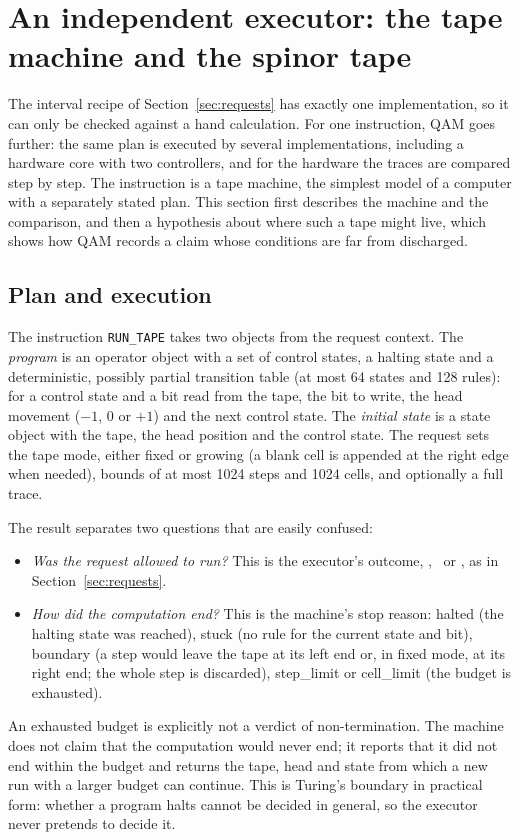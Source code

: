 \section{An independent executor: the tape machine and the spinor tape}\label{sec:tape}

The interval recipe of Section~\ref{sec:requests} has exactly one implementation, so it can only be checked against a hand calculation.
For one instruction, QAM goes further: the same plan is executed by several implementations, including a hardware core with two controllers, and for the hardware the traces are compared step by step. The instruction is a tape machine, the simplest model of a computer with a
separately stated plan. This section first describes the machine and the comparison, and then a hypothesis about where such a tape
might live, which shows how QAM records a claim whose conditions are far from discharged.

\subsection{Plan and execution}

The instruction \texttt{RUN\_TAPE} takes two objects from the request context. The \emph{program} is an operator object with a set of
control states, a halting state and a deterministic, possibly partial transition table (at most 64 states and 128 rules): for a control
state and a bit read from the tape, the bit to
write, the head movement ($-1$, $0$ or $+1$) and the next control state. The \emph{initial state} is a state object with the tape, the
head position and the control state. The request sets the tape mode, either fixed or growing (a blank cell is appended at the right edge
when needed), bounds of at most 1024 steps and 1024 cells, and optionally a full trace.

The result separates two questions that are easily confused:
\begin{itemize}[leftmargin=1.5em]
\item \emph{Was the request allowed to run?} This is the executor's outcome, \cont, \guard\ or \reject, as in Section~\ref{sec:requests}.
\item \emph{How did the computation end?} This is the machine's stop reason: \textsf{halted} (the halting state was reached),
\textsf{stuck} (no rule for the current state and bit), \textsf{boundary} (a step would leave the tape at its left end or, in fixed mode, at its right end; the whole step is discarded),
\textsf{step\_limit} or \textsf{cell\_limit} (the budget is exhausted).
\end{itemize}
An exhausted budget is explicitly not a verdict of non-termination. The machine does not claim that the computation would never end; it
reports that it did not end within the budget and returns the tape, head and state from which a new run with a larger budget can
continue. This is Turing's boundary in practical form: whether a program halts cannot be decided in general, so the executor never
pretends to decide it.

